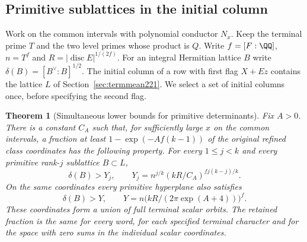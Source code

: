\documentclass[a4paper,11pt]{article}
\newtheorem{theorem}[proposition]{Theorem}
\theoremstyle{definition}
\theoremstyle{remark}
\numberwithin{equation}{section}
\begin{document}
\subsection{Primitive sublattices in the initial column}\label{nav:IX-30}
Work on the common intervals with polynomial conductor \(N_x\).
Keep the terminal prime \(T\) and the two level primes whose
product is \(Q\). Write \(f=[F:\QQ]\), \(n=T^f\) and
\(R=|\operatorname{disc} E|^{1/(2f)}\). For an integral
Hermitian lattice \(B\) write \(\delta(B)=[B^\vee:B]^{1/2}\).
The initial column of a row with first flag \(X+Ez\) contains
the lattice \(L\) of Section~\ref{sec:termmean221}. We select a
set of initial columns once, before specifying the second flag.

\begin{theorem}[Simultaneous lower bounds for primitive determinants]
\leavevmode\label{thm:columns235}
Fix \(A>0\). There is a constant \(C_A\) such that, for
sufficiently large \(x\) on the common intervals, a fraction at
least \(1-\exp(-Af(k-1))\) of the original refined class
coordinates has the following property. For every \(1\le j<k\)
and every primitive rank-\(j\) sublattice \(B\subset L\),
\[
 \delta(B)>Y_j,\qquad
 Y_j=n^{j/k}(kR/C_A)^{fj(k-j)/k}.
\]
On the same coordinates every primitive hyperplane also satisfies
\[
        \delta(B)>Y,\qquad
        Y=n\bigl(kR/(2\pi\exp(A+4))\bigr)^f .
\]
These coordinates form a union of full terminal scalar orbits.
The retained fraction is the same for every word, for each
specified terminal character and for the space with zero sums in
the individual scalar coordinates.
\end{theorem}
\end{document}
